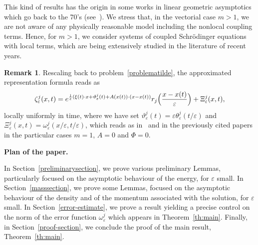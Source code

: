 \documentclass[11pt]{amsart}
\numberwithin{equation}{section}
\theoremstyle{definition}
\newtheorem{remark}[theorem]{Remark}
\begin{document}
This kind of results has the origin in some works in linear geometric asymptotics which go back to the 70's
(see~\cite{GS}). We stress that, in the vectorial case $m>1$, we are not aware of any physically reasonable model including the
nonlocal coupling terms. Hence, for $m>1$, we consider systems of coupled Schr\"odinger equations with local terms,
which are being extensively studied in the literature of recent years.

\begin{remark}
Rescaling back to problem~\eqref{problematilde}, the
approximated representation formula reads as
\begin{equation*}
    \zeta_{\varepsilon}^j(x,t)=e^{\frac{{\rm i}}{\varepsilon}(\xi(t)\cdot x+\vartheta^j_{\varepsilon}(t)+A(x(t))
    \cdot (x-x(t))}r_j\Big(\frac{x-x(t)}{\varepsilon}\Big)+\Xi^j_{\varepsilon}(x,t),
\end{equation*}
locally uniformly in time, where we have set $\vartheta^j_{\varepsilon}(t)={\varepsilon}\theta^j_{\varepsilon}(t/{\varepsilon})$ and
$\Xi^j_{\varepsilon}(x,t)=\omega^j_{\varepsilon}(x/{\varepsilon},t/{\varepsilon})$, which reads as in~\cite{squa} and in the
previously cited papers in the particular cases $m=1$, $A=0$ and $\Phi=0$.
\end{remark}

\vskip25pt
\begin{center}\textbf{Plan of the paper.}\end{center}
In Section~\ref{preliminarysection}, we prove various preliminary Lemmas, particularly
focused on the asymptotic behaviour of the energy, for ${\varepsilon}$ small.
In Section~\ref{masssection}, we prove some Lemmas, focused on the asymptotic
behaviour of the density and of the momentum associated with the solution, for ${\varepsilon}$ small.
In Section~\ref{error-estimate}, we prove a result yielding a precise control
on the norm of the error function $\omega^j_{\varepsilon}$ which appears in Theorem~\ref{th:main}.
Finally, in Section~\ref{proof-section}, we conclude the proof of the main result, Theorem~\ref{th:main}.
\end{document}

